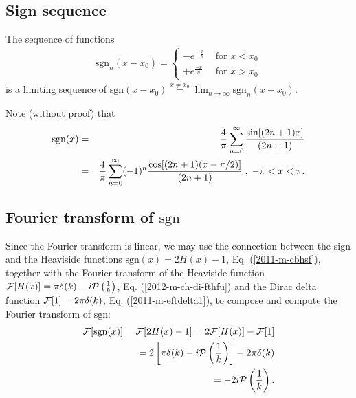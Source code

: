 \subsection{Sign sequence}


The sequence of functions
\begin{equation}
\begin{split}
\textrm{sgn}_n(x-x_0)
=
\left\{
\begin{array}{rl}
- e^{-\frac{x}{n}}&\textrm{ for } x < x_0\\
+ e^{\frac{-x}{n}}&\textrm{ for } x > x_0
\end{array}
\right.
\end{split}
\label{2012-m-ch-di-lsegn}
\end{equation}
is a limiting sequence of
$
\textrm{sgn}(x-x_0)\stackrel{x\neq x_0}{=} \lim_{n\rightarrow \infty} \textrm{sgn}_n(x-x_0)
$.

Note (without proof) that
\begin{eqnarray}
\mbox{sgn}(x)
&=&{4\over \pi }\sum_{n=0}^\infty {\sin [
(2n+1)x]\over
(2n+1)}\\
&=&{4\over \pi }\sum_{n=0}^\infty (-1)^n{\cos [
(2n+1)(x-\pi /2)]\over
(2n+1)}\;,\; -\pi <x<\pi  .
 \end{eqnarray}




\subsection{Fourier transform of $\textrm{sgn}$}

Since the Fourier transform is linear,
we may use the connection between the sign and the Heaviside functions $\textrm{sgn}(x) = 2H(x) -1$, Eq. (\ref{2011-m-cbhsf}),
together with the
Fourier transform of the Heaviside function
${\cal F}[H(x)] =  \pi \delta (k)   -i {\cal P} \left(\frac{1}{k}\right)$,
Eq. (\ref{2012-m-ch-di-fthfu}) and the Dirac delta function
${\cal F}[1] = 2\pi \delta (k)$, Eq. (\ref{2011-m-eftdelta1}),
to compose and compute the Fourier transform  of $\textrm{sgn}$:
\begin{equation}
\begin{split}
{\cal F}[\textrm{sgn}(x)] = {\cal F}[2H(x) -1] = 2{\cal F}[H(x)] - {\cal F}[1]
\\ \qquad =
2 \left[\pi \delta (k)   -i {\cal P} \left(\frac{1}{k}\right)\right] -  2\pi \delta (k)
\\ \qquad =
-2i {\cal P} \left(\frac{1}{k}\right)
.
\end{split}
\label{2011-m-ch-di-fdsgnfu}
\end{equation}

